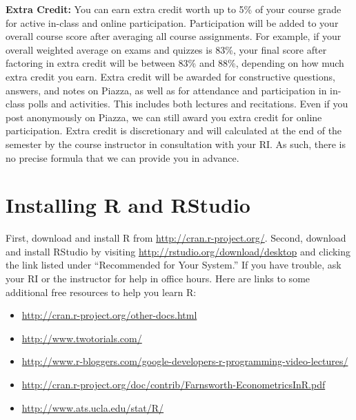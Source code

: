 \documentclass[11pt, letterpaper]{article}
\begin{document}
\noindent \textbf{Extra Credit:} 
You can earn extra credit worth up to 5\% of your course grade for active in-class and online participation. 
Participation will be added to your overall course score after averaging all course assignments.
For example, if your overall weighted average on exams and quizzes is 83\%, your final score after factoring in extra credit will be between 83\% and 88\%, depending on how much extra credit you earn. 
Extra credit will be awarded for constructive questions, answers, and notes on Piazza, as well as for attendance and participation in in-class polls and activities.
This includes both lectures and recitations.
Even if you post anonymously on Piazza, we can still award you extra credit for online participation.
Extra credit is discretionary and will calculated at the end of the semester by the course instructor in consultation with your RI.
As such, there is no precise formula that we can provide you in advance.

\section*{Installing R and RStudio} First, download and install R from \url{http://cran.r-project.org/}. Second, download and install RStudio by visiting \url{http://rstudio.org/download/desktop} and clicking the link listed under ``Recommended for Your System.'' 
If you have trouble, ask your RI or the instructor for help in office hours.
Here are links to some additional free resources to help you learn R:
\begin{itemize}
		       \item \url{http://cran.r-project.org/other-docs.html}
\item \url{http://www.twotorials.com/}
			\item \url{http://www.r-bloggers.com/google-developers-r-programming-video-lectures/}
		 	\item \url{http://cran.r-project.org/doc/contrib/Farnsworth-EconometricsInR.pdf}
 			\item \url{http://www.ats.ucla.edu/stat/R/}
\end{itemize}


\newpage


\end{document}
